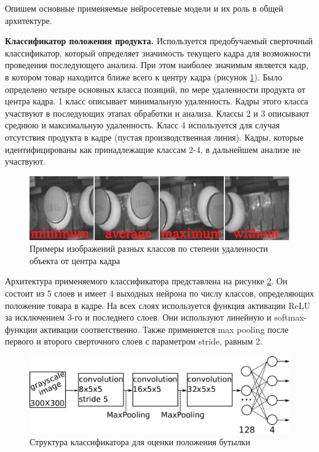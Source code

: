 Опишем основные применяемые нейросетевые модели и их роль в общей архитектуре.

\textbf{Классификатор положения продукта.} Используется предобучаемый сверточный классификатор, который определяет значимость текущего кадра для возможности проведения последующего анализа. При этом наиболее значимым является кадр, в котором товар находится ближе всего к центру кадра (рисунок \ref{fig:distance_classes}). Было определено четыре основных класса позиций, по мере удаленности продукта от центра кадра. 1 класс описывает минимальную удаленность. Кадры этого класса участвуют в последующих этапах обработки и анализа. Классы 2 и 3 описывают среднюю и максимальную удаленность. Класс 4 используется для случая отсутствия продукта в кадре (пустая производственная линия).
Кадры, которые идентифицированы как принадлежащие классам 2-4, в дальнейшем анализе не участвуют. 

\begin{figure}[ht]
	\centering
	\includegraphics[width=16cm]{man-source/images/ch4/pic4-24.jpg}
	\caption{Примеры изображений разных классов по степени удаленности объекта от центра кадра}
	\label{fig:distance_classes}
\end{figure}

Архитектура применяемого классификатора представлена на рисунке \ref{fig:nn_class1}. Он состоит из 5 слоев и имеет 4 выходных нейрона по числу классов, определяющих положение товара в кадре. На всех слоях используется функция активации ReLU за исключением 3-го и последнего слоев. Они используют линейную и softmax-функции активации соответственно. Также применяется max pooling после первого и второго сверточного слоев с параметром stride, равным 2.

\begin{figure}[ht]
	\centering
	\includegraphics[width=16cm]{man-source/images/ch4/pic4-4.pdf}
	\caption{Структура классификатора для оценки положения бутылки \cite{26-A}}
	\label{fig:nn_class1}
\end{figure}

